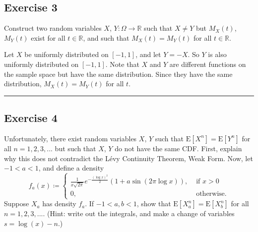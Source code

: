 \documentclass{article}
\theoremstyle{break}
\newenvironment{solution}{{\bf Solution:}}{\hfill\rule{2mm}{2mm}}
\newcommand{\E}{\mathrm{E}}
\newcommand{\R}{\mathbb{R}}
\begin{document}
\subsection*{Exercise 3}
Construct two random variables $X$, $Y: \Omega \rightarrow \R$ such that $X \not = Y$ but $M_X(t)$, $M_Y(t)$ exist for all $t \in \R$, and such that $M_X(t) = M_Y(t)$ for all $t \in \R$.

\begin{solution}
Let $X$ be uniformly distributed on $[-1,1]$, and let $Y = -X$. So $Y$ is also uniformly distributed on $[-1,1]$. Note that $X$ and $Y$ are different functions on the sample space but have the same distribution. Since they have the same distribution, $M_X(t) = M_Y(t)$ for all $t$.
\end{solution}

\subsection*{Exercise 4}
Unfortunately, there exist random variables $X$, $Y$ such that $\E[X^n] = \E[Y^n]$ for all $n = 1, 2, 3, ...$ but such that $X$, $Y$ do not have the same CDF. First, explain why this does not contradict the L\'evy Continuity Theorem, Weak Form. Now, let $-1 < a < 1$, and define a density
\[ f_a(x) \coloneqq \begin{cases}
\frac{1}{x \sqrt{2 \pi}} e^{- \frac{(\log x )^2}{2}} (1 + a \sin(2\pi \log x)), & \text{ if } x > 0 \\
0, & \text{ otherwise.}
\end{cases}
\]
Suppose $X_a$ has density $f_a$. If $-1 < a, b < 1$, show that $\E[X_a^n] = \E[X_b^n]$ for all $n = 1,2,3,...$. (Hint: write out the integrals, and make a change of variables $s = \log(x) - n$.)
\end{document}
